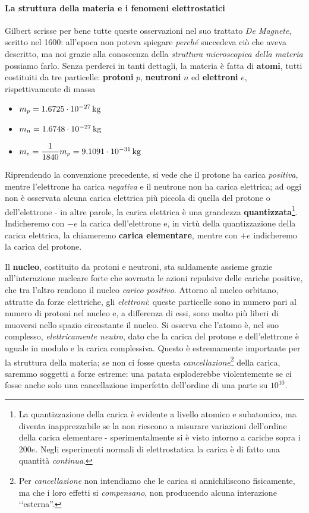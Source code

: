 \paragraph{La struttura della materia e i fenomeni elettrostatici}
Gilbert scrisse per bene tutte queste osservazioni nel suo trattato \textit{De Magnete}, scritto nel 1600: all'epoca non poteva spiegare \textit{perché} succedeva ciò che aveva descritto, ma noi grazie alla conoscenza della \textit{struttura microscopica della materia} possiamo farlo. Senza perderci in tanti dettagli, la materia è fatta di \textbf{atomi}, tutti costituiti da tre particelle: \textbf{protoni} $p$, \textbf{neutroni} $n$ ed \textbf{elettroni} $e$, rispettivamente di massa
\begin{itemize}
	\item $m_p = \SI[exponent-product=\ensuremath{\cdot}]{1.6725d-27}{\kilogram}$ 
	\item $m_n = \SI[exponent-product=\ensuremath{\cdot}]{1.6748d-27}{\kilogram}$
	\item $m_e = \dfrac{1}{1840}m_p=\SI[exponent-product=\ensuremath{\cdot}]{9,1091d-31}{\kilogram}$
\end{itemize}
Riprendendo la convenzione precedente, si vede che il protone ha carica \textit{positiva}, mentre l'elettrone ha carica \textit{negativa} e il neutrone non ha carica elettrica; ad oggi non è osservata alcuna carica elettrica più piccola di quella del protone o dell'elettrone - in altre parole, la carica elettrica è una grandezza \textbf{quantizzata}\footnote{La quantizzazione della carica è evidente a livello atomico e subatomico, ma diventa inapprezzabile se la non riescono a misurare variazioni dell'ordine della carica elementare - sperimentalmente si è visto intorno a cariche sopra i $200 e$. Negli esperimenti normali di elettrostatica la carica è di fatto una quantità \textit{continua}.}. Indicheremo con $-e$ la carica dell'elettrone e, in virtù della quantizzazione della carica elettrica, la chiameremo \textbf{carica elementare}, mentre con $+e$ indicheremo la carica del protone.

Il \textbf{nucleo}, costituito da protoni e neutroni, sta saldamente assieme grazie all'interazione nucleare forte che sovrasta le azioni repulsive delle cariche positive, che tra l'altro rendono il nucleo \textit{carico positivo}. Attorno al nucleo orbitano, attratte da forze elettriche, gli \textit{elettroni}: queste particelle sono in numero pari al numero di protoni nel nucleo e, a differenza di essi, sono molto più liberi di muoversi nello spazio circostante il nucleo. Si osserva che l'atomo è, nel suo complesso, \textit{elettricamente neutro}, dato che la carica del protone e dell'elettrone è uguale in modulo e la carica complessiva. Questo è estremamente importante per la struttura della materia; se non ci fosse questa \textit{cancellazione}\footnote{Per \textit{cancellazione} non intendiamo che le carica si annichiliscono fisicamente, ma che i loro effetti si \textit{compensano}, non producendo alcuna interazione ‘‘esterna''.} della carica, saremmo soggetti a forze estreme: una patata esploderebbe violentemente se ci fosse anche solo una cancellazione imperfetta dell'ordine di una parte su $10^10$.


